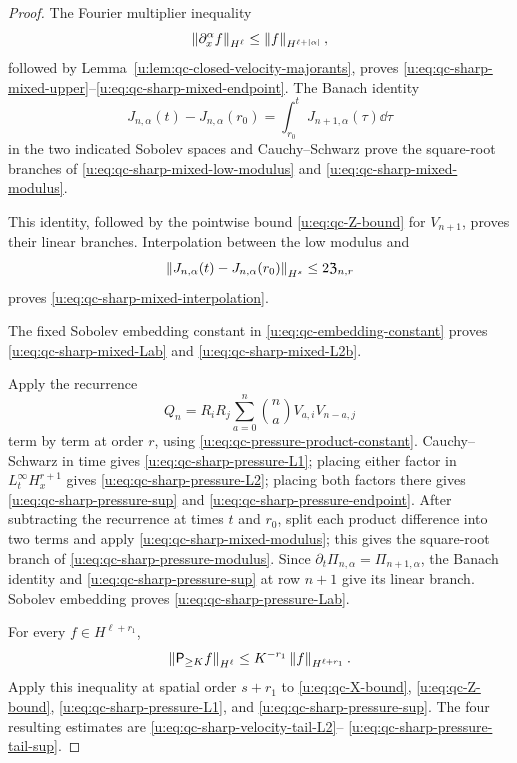 {\begin{proof}
The Fourier multiplier inequality
\[
 \left\lVert \partial_x^\alpha f\right\rVert_{H^\ell}
 \le\left\lVert f\right\rVert_{H^{\ell+|\alpha|}},
\]
followed by Lemma~\ref{u:lem:qc-closed-velocity-majorants}, proves
\eqref{u:eq:qc-sharp-mixed-upper}--\eqref{u:eq:qc-sharp-mixed-endpoint}.
The Banach identity
\[
 J_{n,\alpha}(t)-J_{n,\alpha}(r_0)
 =\int_{r_0}^tJ_{n+1,\alpha}(\tau)\dd\tau
\]
in the two indicated Sobolev spaces and Cauchy--Schwarz prove the
square-root branches of \eqref{u:eq:qc-sharp-mixed-low-modulus} and
\eqref{u:eq:qc-sharp-mixed-modulus}.
\begin{samepage}
This identity, followed by the
pointwise bound \eqref{u:eq:qc-Z-bound} for \(V_{n+1}\), proves their linear
branches.  Interpolation between the low modulus
and
\[
 \left\lVert J_{n,\alpha}(t)-J_{n,\alpha}(r_0)\right\rVert_{H^s}
 \le2\mathfrak Z_{n,r}
\]
proves \eqref{u:eq:qc-sharp-mixed-interpolation}.
\end{samepage}
The fixed Sobolev embedding constant in \eqref{u:eq:qc-embedding-constant} proves
\eqref{u:eq:qc-sharp-mixed-Lab} and \eqref{u:eq:qc-sharp-mixed-L2b}.

Apply the recurrence
\[
 Q_n=R_iR_j\sum_{a=0}^{n}\binom naV_{a,i}V_{n-a,j}
\]
term by term at order \(r\), using
\eqref{u:eq:qc-pressure-product-constant}.  Cauchy--Schwarz in time gives
\eqref{u:eq:qc-sharp-pressure-L1}; placing either factor in
\(L_t^\infty H_x^{r+1}\) gives
\eqref{u:eq:qc-sharp-pressure-L2}; placing both factors there gives
\eqref{u:eq:qc-sharp-pressure-sup} and
\eqref{u:eq:qc-sharp-pressure-endpoint}.  After subtracting the recurrence at
times \(t\) and \(r_0\), split each product difference into two terms and
apply \eqref{u:eq:qc-sharp-mixed-modulus}; this gives the square-root branch
of \eqref{u:eq:qc-sharp-pressure-modulus}.  Since
\(\partial_t\Pi_{n,\alpha}=\Pi_{n+1,\alpha}\), the Banach identity and
\eqref{u:eq:qc-sharp-pressure-sup} at row \(n+1\) give its linear branch.
Sobolev embedding proves
\eqref{u:eq:qc-sharp-pressure-Lab}.

For every \(f\in H^{\ell+r_1}\),
\[
 \left\lVert \mathsf P_{\ge K}f\right\rVert_{H^\ell}
 \le K^{-r_1}\left\lVert f\right\rVert_{H^{\ell+r_1}}.
\]
Apply this inequality at spatial order \(s+r_1\) to
\eqref{u:eq:qc-X-bound}, \eqref{u:eq:qc-Z-bound},
\eqref{u:eq:qc-sharp-pressure-L1}, and
\eqref{u:eq:qc-sharp-pressure-sup}.  The four resulting estimates are
\eqref{u:eq:qc-sharp-velocity-tail-L2}--%
\eqref{u:eq:qc-sharp-pressure-tail-sup}.


\end{proof}}
